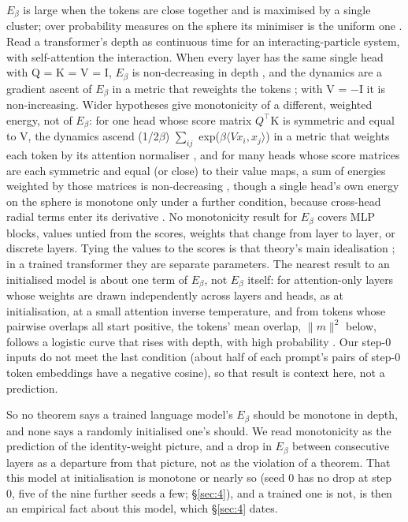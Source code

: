 \documentclass[11pt]{article}
\begin{document}
$E_\beta $ is large when the tokens are close together and is maximised by a single cluster; over probability measures on the sphere its minimiser is the uniform one \citep[Prop. 3.4]{geshkovski2023}. Read a transformer's depth as continuous time for an interacting-particle system, with self-attention the interaction. When every layer has the same single head with Q = K = V = I, $E_\beta $ is non-decreasing in depth \citep[\S{}3.2]{geshkovski2023}, and the dynamics are a gradient ascent of $E_\beta $ in a metric that reweights the tokens \citep[\S{}3.4]{geshkovski2023}; with V = $-$I it is non-increasing. Wider hypotheses give monotonicity of a different, weighted energy, not of $E_\beta $: for one head whose score matrix $Q^{\top}$K is symmetric and equal to V, the dynamics ascend (1/2$\beta $) $\sum _{ij}$ exp($\beta \langle Vx_{i}, x_{j}\rangle $) in a metric that weights each token by its attention normaliser \citep[\S{}3.4.1]{geshkovski2023}, and for many heads whose score matrices are each symmetric and equal (or close) to their value maps, a sum of energies weighted by those matrices is non-decreasing \citep[Theorems 11--12]{pendharkar2026}, though a single head's own energy on the sphere is monotone only under a further condition, because cross-head radial terms enter its derivative \citep[\S{}4.2, Theorem 17]{pendharkar2026}. No monotonicity result for $E_\beta $ covers MLP blocks, values untied from the scores, weights that change from layer to layer, or discrete layers. Tying the values to the scores is that theory's main idealisation \citep[Remark 5]{pendharkar2026}; in a trained transformer they are separate parameters. The nearest result to an initialised model is about one term of $E_\beta $, not $E_\beta $ itself: for attention-only layers whose weights are drawn independently across layers and heads, as at initialisation, at a small attention inverse temperature, and from tokens whose pairwise overlaps all start positive, the tokens' mean overlap, $\|m\|^{2}$ below, follows a logistic curve that rises with depth, with high probability \citep{koubbi2026}. Our step-0 inputs do not meet the last condition (about half of each prompt's pairs of step-0 token embeddings have a negative cosine), so that result is context here, not a prediction.

So no theorem says a trained language model's $E_\beta $ should be monotone in depth, and none says a randomly initialised one's should. We read monotonicity as the prediction of the identity-weight picture, and a drop in $E_\beta $ between consecutive layers as a departure from that picture, not as the violation of a theorem. That this model at initialisation is monotone or nearly so (seed 0 has no drop at step 0, five of the nine further seeds a few; \S\ref{sec:4}), and a trained one is not, is then an empirical fact about this model, which \S\ref{sec:4} dates.
\end{document}
